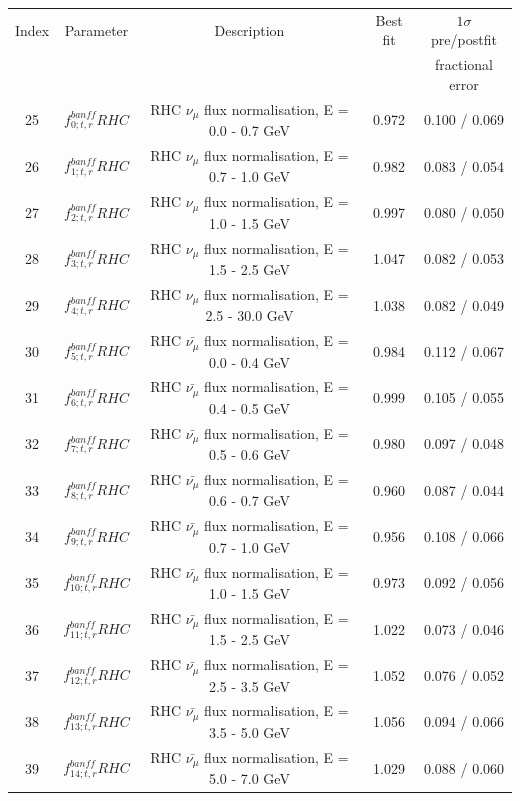 \begin{tabular} { | c | c | c | c | c |  }
\hline 
Index & Parameter & Description & Best fit & $1\sigma$ pre/postfit\\ 
 & &  &  & fractional error\\
\hline 
25 & $f_{0; t, r}^{banff} RHC$ & RHC $\nu_\mu$ flux normalisation, E = 0.0 - 0.7 GeV & 0.972 & 0.100 / 0.069\\ 
26 & $f_{1; t, r}^{banff} RHC$ & RHC $\nu_\mu$ flux normalisation, E = 0.7 - 1.0 GeV & 0.982 & 0.083 / 0.054\\ 
27 & $f_{2; t, r}^{banff} RHC$ & RHC $\nu_\mu$ flux normalisation, E = 1.0 - 1.5 GeV & 0.997 & 0.080 / 0.050\\ 
28 & $f_{3; t, r}^{banff} RHC$ & RHC $\nu_\mu$ flux normalisation, E = 1.5 - 2.5 GeV & 1.047 & 0.082 / 0.053\\ 
29 & $f_{4; t, r}^{banff} RHC$ & RHC $\nu_\mu$ flux normalisation, E = 2.5 - 30.0 GeV & 1.038 & 0.082 / 0.049\\ 
30 & $f_{5; t, r}^{banff} RHC$ & RHC $\bar{\nu_\mu}$ flux normalisation, E = 0.0 - 0.4 GeV & 0.984 & 0.112 / 0.067\\ 
31 & $f_{6; t, r}^{banff} RHC$ & RHC $\bar{\nu_\mu}$ flux normalisation, E = 0.4 - 0.5 GeV & 0.999 & 0.105 / 0.055\\ 
32 & $f_{7; t, r}^{banff} RHC$ & RHC $\bar{\nu_\mu}$ flux normalisation, E = 0.5 - 0.6 GeV & 0.980 & 0.097 / 0.048\\ 
33 & $f_{8; t, r}^{banff} RHC$ & RHC $\bar{\nu_\mu}$ flux normalisation, E = 0.6 - 0.7 GeV & 0.960 & 0.087 / 0.044\\ 
34 & $f_{9; t, r}^{banff} RHC$ & RHC $\bar{\nu_\mu}$ flux normalisation, E = 0.7 - 1.0 GeV & 0.956 & 0.108 / 0.066\\ 
35 & $f_{10; t, r}^{banff} RHC$ & RHC $\bar{\nu_\mu}$ flux normalisation, E = 1.0 - 1.5 GeV & 0.973 & 0.092 / 0.056\\ 
36 & $f_{11; t, r}^{banff} RHC$ & RHC $\bar{\nu_\mu}$ flux normalisation, E = 1.5 - 2.5 GeV & 1.022 & 0.073 / 0.046\\ 
37 & $f_{12; t, r}^{banff} RHC$ & RHC $\bar{\nu_\mu}$ flux normalisation, E = 2.5 - 3.5 GeV & 1.052 & 0.076 / 0.052\\ 
38 & $f_{13; t, r}^{banff} RHC$ & RHC $\bar{\nu_\mu}$ flux normalisation, E = 3.5 - 5.0 GeV & 1.056 & 0.094 / 0.066\\ 
39 & $f_{14; t, r}^{banff} RHC$ & RHC $\bar{\nu_\mu}$ flux normalisation, E = 5.0 - 7.0 GeV & 1.029 & 0.088 / 0.060\\ 

\end{tabular}
